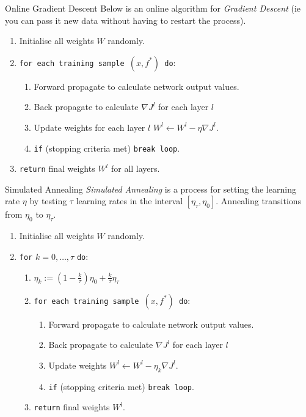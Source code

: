 \documentclass[11pt,a4paper]{article}
\begin{document}
  \begin{definition}{Online Gradient Descent}
    Below is an online algorithm for \textit{Gradient Descent} (ie you can pass it new data without having to restart the process).
    \begin{enumerate}
      \item Initialise all weights $W$ randomly.
      \item \texttt{for each training sample $(x,f^*)$ do}:
      \begin{enumerate}
        \item Forward propagate to calculate network output values.
        \item Back propagate to calculate $\nabla J^l$ for each layer $l$
        \item Update weights for each layer $l$  $W^l\leftarrow W^l-\eta\nabla J^l$.
        \item \texttt{if} (stopping criteria met) \texttt{break loop}.
      \end{enumerate}
      \item \texttt{return} final weights $W^l$ for all layers.
    \end{enumerate}
  \end{definition}

  \begin{definition}{Simulated Annealing}
    \textit{Simulated Annealing} is a process for setting the learning rate $\eta$ by testing $\tau$ learning rates in the interval $[\eta_\tau,\eta_0]$. Annealing transitions from $\eta_0$ to $\eta_\tau$.
    \begin{enumerate}
      \item Initialise all weights $W$ randomly.
      \item \texttt{for} $k=0,\dots,\tau$ \texttt{do}:
      \begin{enumerate}
        \item $\eta_k:=\left(1-\frac{k}\tau\right)\eta_0+\frac{k}\tau\eta_\tau$
        \item \texttt{for each training sample $(x,f^*)$ do}:
        \begin{enumerate}
          \item Forward propagate to calculate network output values.
          \item Back propagate to calculate $\nabla J^l$ for each layer $l$
          \item Update weights $W^l\leftarrow W^l-\eta_k\nabla J^l$.
          \item \texttt{if} (stopping criteria met) \texttt{break loop}.
        \end{enumerate}
        \item \texttt{return} final weights $W^l$.
      \end{enumerate}
    \end{enumerate}
  \end{definition}
\end{document}
